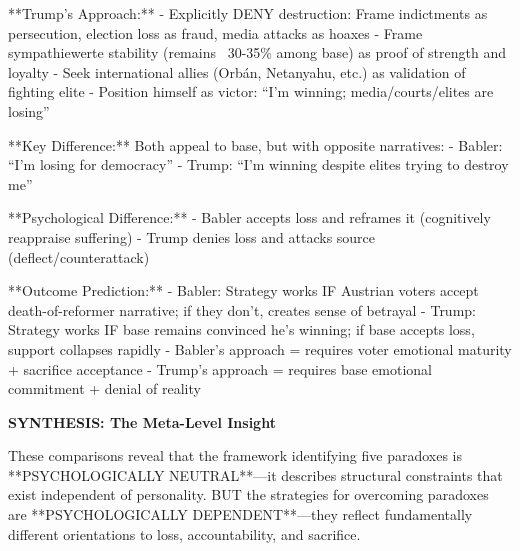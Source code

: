 **Trump's Approach:**
- Explicitly DENY destruction: Frame indictments as persecution, election loss as fraud, media attacks as hoaxes
- Frame sympathiewerte stability (remains ~30-35\% among base) as proof of strength and loyalty
- Seek international allies (Orbán, Netanyahu, etc.) as validation of fighting elite
- Position himself as victor: ``I'm winning; media/courts/elites are losing''

**Key Difference:** Both appeal to base, but with opposite narratives:
- Babler: ``I'm losing for democracy''
- Trump: ``I'm winning despite elites trying to destroy me''

**Psychological Difference:**
- Babler accepts loss and reframes it (cognitively reappraise suffering)
- Trump denies loss and attacks source (deflect/counterattack)

**Outcome Prediction:**
- Babler: Strategy works IF Austrian voters accept death-of-reformer narrative; if they don't, creates sense of betrayal
- Trump: Strategy works IF base remains convinced he's winning; if base accepts loss, support collapses rapidly
- Babler's approach = requires voter emotional maturity + sacrifice acceptance
- Trump's approach = requires base emotional commitment + denial of reality

\vspace{0.5cm}

\textbf{SYNTHESIS: The Meta-Level Insight}

These comparisons reveal that the framework identifying five paradoxes is **PSYCHOLOGICALLY NEUTRAL**—it describes
structural constraints that exist independent of personality. BUT the strategies for overcoming paradoxes are
**PSYCHOLOGICALLY DEPENDENT**—they reflect fundamentally different orientations to loss, accountability, and sacrifice.

